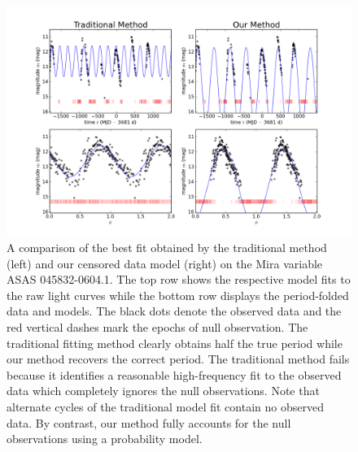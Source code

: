 \documentclass[12pt,preprint]{aastex}
\begin{document}
\clearpage
\begin{figure}
  \begin{center}
\includegraphics[angle=0,width=6.5in]{../plots/fig_045832-0604_1.png}
  \end{center}
  \caption{A comparison of the best fit obtained by the traditional method (left) and our censored data model (right) on the Mira variable ASAS 045832-0604.1.  The top row shows the respective model fits to the raw light curves while the bottom row displays the period-folded data and models.  The black dots denote the observed data and the red vertical dashes mark the epochs of null observation.  The traditional fitting method clearly obtains half the true period while our method recovers the correct period.  The traditional method fails because it identifies a reasonable high-frequency fit to the observed data which completely ignores the null observations.  Note that alternate cycles of the traditional model fit contain no observed data.  By contrast, our method fully accounts for the null observations using a probability model.\label{fig:badfit}}
\end{figure}
\end{document}
